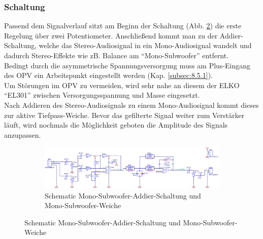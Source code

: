 \subsubsection{Schaltung}\label{subsec:5.5.2}
Passend dem Signalverlauf sitzt am Beginn der Schaltung (Abb. \ref{fig:5.5.2.1}) die erste Regelung über zwei Potentiometer.
Anschließend kommt man zu der Addier-Schaltung, welche das Stereo-Audiosignal in ein Mono-Audiosignal wandelt und dadurch Stereo-Effekte wie zB. Balance am \enquote{Mono-Subwoofer} entfernt.\\
Bedingt durch die asymmetrische Spannungsversorgung muss am Plus-Eingang des OPV ein Arbeitspunkt eingestellt werden (Kap. \ref{subsec:8.5.1}).\\
Um Störungen im OPV zu vermeiden, wird sehr nahe an diesem der ELKO \enquote{EL301} zwischen Versorgungsspannung und Masse eingesetzt.\\
Nach Addieren des Stereo-Audiosignals zu einem Mono-Audiosignal kommt dieses zur aktive Tiefpass-Weiche.
Bevor das gefilterte Signal weiter zum Verstärker läuft, wird nochmals die Möglichkeit geboten die Amplitude des Signals anzupassen.
\begin{figure}
	\begin{figure} [H]
		\centering
		\includegraphics[width=\linewidth,height=0.9\textheight,keepaspectratio]{img/Print3/3mTTWeicheruAddiererDiplSchematic.PNG}
		\caption{Schematic Mono-Subwoofer-Addier-Schaltung und Mono-Subwoofer-Weiche}
		\label {fig:5.5.2.1}
	\end{figure}
\end{figure}
	

\newpage
